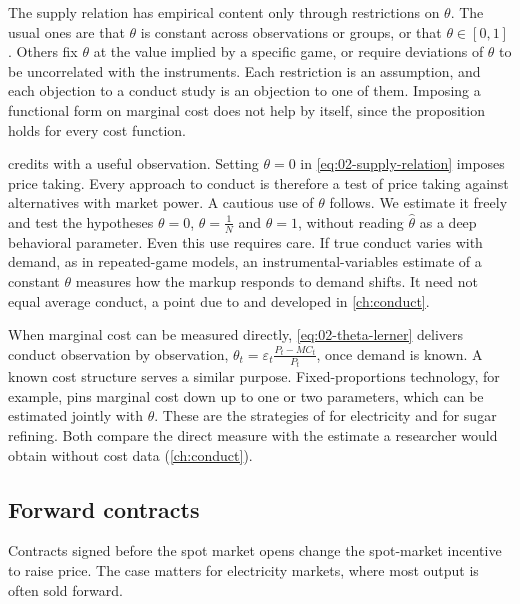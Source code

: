 The supply relation has empirical content only through restrictions on $\theta$. The usual ones are that $\theta$ is
constant across observations or groups, or that $\theta \in [0, 1]$. Others fix $\theta$ at the value implied by a
specific game, or require deviations of $\theta$ to be uncorrelated with the instruments. Each restriction is an assumption, and
each objection to a conduct study is an objection to one of them. Imposing a functional form on marginal cost does not
help by itself, since the proposition holds for every cost function.

 \citet[p.~1031]{Bresnahan1989} credits
\citet{Appelbaum1979} with a useful observation. Setting $\theta = 0$ in \eqref{eq:02-supply-relation} imposes price
taking. Every approach to conduct is therefore a test of price taking against alternatives with market power. A
cautious use of $\theta$ follows. We estimate it freely and test the hypotheses $\theta = 0$,
$\theta = \frac{1}{N}$ and $\theta = 1$, without reading $\hat\theta$ as a deep behavioral parameter. Even this use
requires care. If true conduct varies with demand, as in repeated-game models, an instrumental-variables estimate of a
constant $\theta$ measures how the markup responds to demand shifts. It need not equal average conduct, a point due to
\citet{Corts1999} and developed in \cref{ch:conduct}.

 When marginal cost can be measured directly, \eqref{eq:02-theta-lerner} delivers
conduct observation by observation, $\theta_t = \varepsilon_t\frac{P_t - MC_t}{P_t}$, once demand is known. A known
cost structure serves a similar purpose. Fixed-proportions technology, for example, pins marginal cost down up to one
or two parameters, which can be estimated jointly with $\theta$. These are the strategies of \citet{Wolfram1999} for
electricity and \citet{GenesoveMullin1998} for sugar refining. Both compare the direct measure with the estimate a
researcher would obtain without cost data (\cref{ch:conduct}).

\subsection{Forward contracts}\label{sec:02-forward}

Contracts signed before the spot market opens change the spot-market incentive to raise price. The case matters for
electricity markets, where most output is often sold forward.

